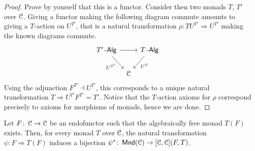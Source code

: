 \documentclass[a4paper,11pt,oneside,openany]{scrbook}
\begin{document}
\begin{proof}
	Prove by yourself that this is a functor. Consider then two monads $T$, $T'$
    over $\operatorname{\mathcal{C}}$. Giving a functor making the following diagram commute amounts to
    giving a $T$-action on $U^{T'}$, that is a natural transformation
    $\rho\colon TU^{T'}\Rightarrow U^{T'}$ making the known diagrams commute.
	\[
		\begin{tikzcd}[column sep=tiny]
			T'\Alg\ar[rr]\ar[dr, swap, "U^{T'}"]
			&& T\Alg\ar[dl, "U^T"] \\
			& \C
		\end{tikzcd}
	\]
	Using the adjunction $F^{T'}\dashv U^{T'}$, this corresponds to a unique
    natural transformation $T\Rightarrow U^{T'}F^{T'}=T'$. Notice that the
    $T$-action axioms for $\rho$ correspond precisely to axioms for morphisms of
    monads, hence we are done.
\end{proof}

\begin{prop}
	Let $F\colon\operatorname{\mathcal{C}}\rightarrow\operatorname{\mathcal{C}}$ be an endofunctor such that the algebraically
    free monad $T(F)$ exists. Then, for every monad $T$ over $\operatorname{\mathcal{C}}$, the natural
    transformation $\psi\colon F\Rightarrow T(F)$ induces a bijection
    $\psi^*\colon\operatorname{\mathsf{Mnd}}(\operatorname{\mathcal{C}})\rightarrow [\operatorname{\mathcal{C}},\operatorname{\mathcal{C}}](F,T)$.
\end{prop}
\end{document}
